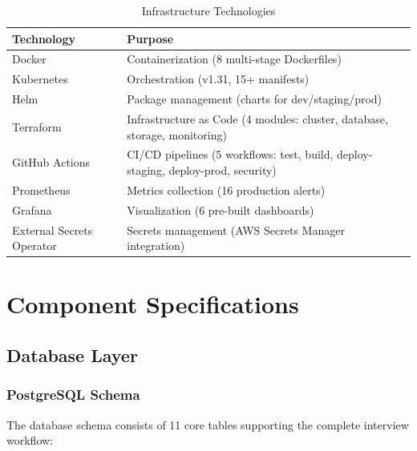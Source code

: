 \documentclass[11pt,letterpaper]{article}
\begin{document}
\begin{table}[H]
\centering
\begin{tabularx}{\textwidth}{lX}
\toprule
\textbf{Technology} & \textbf{Purpose} \\
\midrule
Docker & Containerization (8 multi-stage Dockerfiles) \\
Kubernetes & Orchestration (v1.31, 15+ manifests) \\
Helm & Package management (charts for dev/staging/prod) \\
Terraform & Infrastructure as Code (4 modules: cluster, database, storage, monitoring) \\
GitHub Actions & CI/CD pipelines (5 workflows: test, build, deploy-staging, deploy-prod, security) \\
Prometheus & Metrics collection (16 production alerts) \\
Grafana & Visualization (6 pre-built dashboards) \\
External Secrets Operator & Secrets management (AWS Secrets Manager integration) \\
\bottomrule
\end{tabularx}
\caption{Infrastructure Technologies}
\end{table}


\section{Component Specifications}

\subsection{Database Layer}

\subsubsection{PostgreSQL Schema}

The database schema consists of 11 core tables supporting the complete interview workflow:
\end{document}
